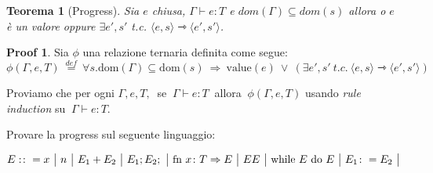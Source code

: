 \documentclass[a4paper, 10pt]{article}
\newtheorem{thm}{Teorema}[]
\theoremstyle{definition}
\newtheorem{prf}{Proof}[]
\newcommand{\srule}[2]{\langle #1 \rangle \rightarrowtriangle \langle #2 \rangle}
\begin{document}
\begin{thm}[Progress]
	Sia $ e $ chiusa, $ \Gamma \vdash e\colon T$ e $ dom(\Gamma) \subseteq dom(s) $ allora o $ e $ è un valore oppure $ \exists e',s'$ t.c. $ \srule{e, s}{e', s'} $.
\end{thm}
\begin{prf}
	Sia $ \phi $ una relazione ternaria definita come segue:
$
		\phi(\Gamma, e, T)\ \stackrel{def}{=} \ \forall s. \text{dom}(\Gamma) \subseteq \text{dom}(s)\ \Rightarrow\ \text{value}(e)\ \vee\ (\exists e', s'\ t.c.\ \srule{e, s}{e', s'})
$

 	Proviamo che per ogni $ \Gamma, e, T,\ $ se $\ \Gamma \vdash e\colon T\ $ allora $\ \phi (\Gamma, e, T) $ usando \textit{rule induction} su $\ \Gamma \vdash e\colon T $.
\end{prf}
\begin{multicols}{2}
Provare la progress sul seguente linguaggio:

\[
	E:\colon = x \ \big|\ n \ \big|\ E_1 + E_2 \ \big|\ E_1;E_2; \ \big|\ \textup{fn}\ x\colon T \Rightarrow E \ \big|\ EE\ 
	\big|\ \textup{while}\ E\ \textup{do}\ E\ \big|\ E_1\colon = E_2 \ \big|
\]



\end{multicols}
\end{document}

